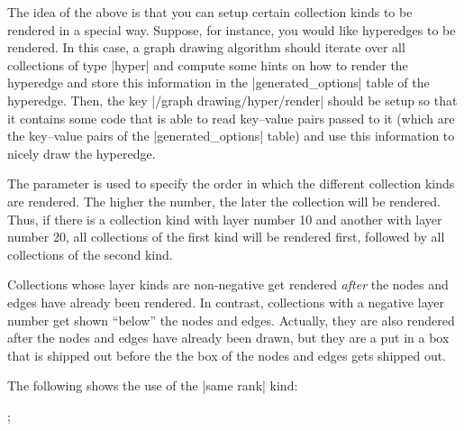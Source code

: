\begin{command}{\pgfgddeclarecollectionkind{}}
  The idea of the above is that you can setup certain collection kinds
  to be rendered in a special way. Suppose, for instance, you would
  like hyperedges to be rendered. In this case, a graph drawing
  algorithm should iterate over all collections of type |hyper| and
  compute some hints on how to render the hyperedge and store this
  information in the |generated_options| table of the hyperedge. Then,
  the key |/graph drawing/hyper/render| should be setup so that it
  contains some code that is able to read key--value pairs passed to
  it (which are the key--value pairs of the |generated_options| table)
  and use this information to nicely draw the hyperedge.

  The  parameter is used to specify the order
  in which the different collection kinds are rendered. The higher the
  number, the later the collection will be rendered. Thus, if there is
  a collection kind with layer number 10 and another with layer number
  20, all collections of the first kind will be rendered first,
  followed by all collections of the second kind.
  
  Collections whose layer kinds are non-negative get rendered
  \emph{after} the nodes and edges have already been rendered. In
  contrast, collections with a negative layer number get shown
  ``below'' the nodes and edges. Actually, they are also rendered
  after the nodes and edges have already been drawn, but they are a
  put in a box that is shipped out before the the box of the nodes and
  edges gets shipped out.

  The following shows the use of the |same rank| kind:
  \begin{codeexample}[]
 ;
\end{codeexample}
\end{command}



